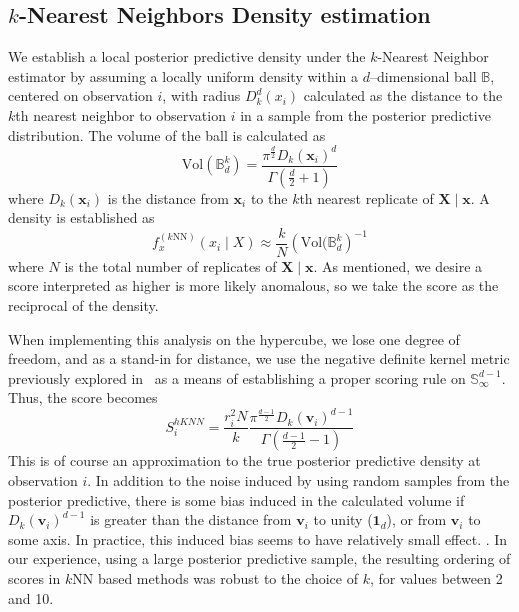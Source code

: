 \subsection{$k$-Nearest Neighbors Density estimation}
We establish a local posterior predictive density under the $k$-Nearest Neighbor 
    estimator \citep{mack1979} by assuming a locally uniform density within a 
    $d$--dimensional ball $\mathbb{B}$, centered on observation $i$, with 
    radius $D_{k}^d(x_i)$ calculated as the distance to the $k$th nearest 
    neighbor to observation $i$ in a sample from the posterior predictive 
    distribution. The volume of the ball is calculated as
    \begin{equation}
        \label{eq:vol_sphere}
        \text{Vol}(\mathbb{B}_d^k) =
        \frac{\pi^{\frac{d}{2}}D_{k}(\bm{x}_i)^d}{
            \Gamma\left(\frac{d}{2} + 1\right)}
    \end{equation}
    where $D_k(\bm{x}_i)$ is the distance from $\bm{x}_i$ to the $k$th nearest 
    replicate of $\bm{X}\mid\bm{x}$.  A density is established as 
    \begin{equation}
        \label{eq:ad_knn}
        f_{x}^{(k\text{NN})}(x_i\mid X) \approx 
            \frac{k}{N}\left(\text{Vol}(\mathbb{B}_d^k\right)^{-1}
    \end{equation}
    where $N$ is the total number of replicates of $\bm{X}\mid\bm{x}$.  As 
    mentioned, we desire a score interpreted as higher is more likely anomalous, 
    so we take the score as the reciprocal of the density.

When implementing this analysis on the hypercube, we lose one degree of freedom,
    and as a stand-in for distance, we use the negative definite kernel metric 
    previously explored in~\cite{trubey:pg} as a means of establishing a proper 
    scoring rule on $\mathbb{S}_{\infty}^{d-1}$.  Thus, the score becomes
    \begin{equation}
        \label{eq:ad_knn_h}
        S_i^{hKNN} = \frac{r_i^{2}N}{k}
        \frac{\pi^{\frac{d-1}{2}}D_{k}(\bm{v}_i)^{d-1}}{
          \Gamma\left(\frac{d-1}{2} - 1\right)}
  \end{equation}
    This is of course an approximation to the true posterior predictive density 
    at observation $i$.  In addition to the noise induced by using random 
    samples from the posterior predictive, there is some bias induced in the 
    calculated volume
    if $D_k(\bm{v}_i)^{d-1}$ is greater than the distance from $\bm{v}_i$ to 
  unity ($\bm{1}_d$), or from $\bm{v}_i$ to some axis.  In practice,
  this induced bias seems to have relatively small effect. 
  .
  In our experience, using a large posterior predictive sample, the resulting 
  ordering of scores in $k$NN based methods was robust to the choice of $k$, for 
  values between 2 and 10.

